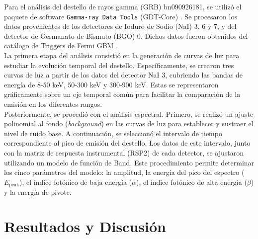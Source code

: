 \documentclass[final,5p,times,twocolumn,authoryear]{elsarticle}
\begin{document}
Para el análisis del destello de rayos gamma (GRB) bn090926181, se utilizó el paquete de software \texttt{Gamma-ray Data Tools} (GDT-Core) \citep{GDT-Core}. Se procesaron los datos provenientes de los detectores de Ioduro de Sodio (NaI) 3, 6 y 7, y del detector de Germanato de Bismuto (BGO) 0. Dichos datos fueron obtenidos del catálogo de Triggers de Fermi GBM \citep{von_Kienlin_2020} \citep{Gruber_2014} \citep{von_Kienlin_2014} \citep{Bhat_2016}. \\

La primera etapa del análisis consistió en la generación de curvas de luz para estudiar la evolución temporal del destello. Específicamente, se crearon tres curvas de luz a partir de los datos del detector NaI 3, cubriendo las bandas de energía de 8-50 keV, 50-300 keV y 300-900 keV. Estas se representaron gráficamente sobre un eje temporal común para facilitar la comparación de la emisión en los diferentes rangos.\\

Posteriormente, se procedió con el análisis espectral. Primero, se realizó un ajuste polinomial al fondo (\textit{background}) en las curvas de luz para establecer y sustraer el nivel de ruido base. A continuación, se seleccionó el intervalo de tiempo correspondiente al pico de emisión del destello. Los datos de este intervalo, junto con la matriz de respuesta instrumental (RSP2) de cada detector, se ajustaron utilizando un modelo de función de Band. Este procedimiento permite determinar los cinco parámetros del modelo: la amplitud, la energía del pico del espectro ($E_{\text{peak}}$), el índice fotónico de baja energía ($\alpha$), el índice fotónico de alta energía ($\beta$) y la energía de pivote.\\




\section{Resultados y Discusión}
\label{resultados}



\end{document}
